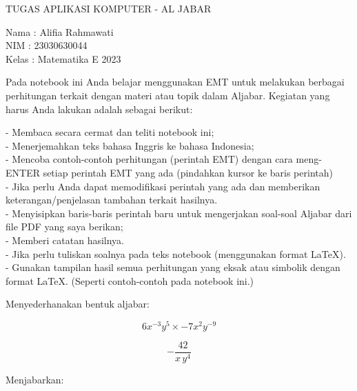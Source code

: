 \documentclass[a4paper,10pt]{article}
\begin{document}
\begin{eulernotebook}
\eulersubheading{}
\begin{eulercomment}
TUGAS APLIKASI KOMPUTER - AL JABAR

Nama  : Alifia Rahmawati\\
NIM   : 23030630044\\
Kelas : Matematika E 2023

\begin{eulercomment}
\begin{eulercomment}
Pada notebook ini Anda belajar menggunakan EMT untuk melakukan
berbagai perhitungan terkait dengan materi atau topik dalam Aljabar.
Kegiatan yang harus Anda lakukan adalah sebagai berikut:

- Membaca secara cermat dan teliti notebook ini;\\
- Menerjemahkan teks bahasa Inggris ke bahasa Indonesia;\\
- Mencoba contoh-contoh perhitungan (perintah EMT) dengan cara
meng-ENTER setiap perintah EMT yang ada (pindahkan kursor ke baris
perintah)\\
- Jika perlu Anda dapat memodifikasi perintah yang ada dan memberikan
keterangan/penjelasan tambahan terkait hasilnya.\\
- Menyisipkan baris-baris perintah baru untuk mengerjakan soal-soal
Aljabar dari file PDF yang saya berikan;\\
- Memberi catatan hasilnya.\\
- Jika perlu tuliskan soalnya pada teks notebook (menggunakan format
LaTeX).\\
- Gunakan tampilan hasil semua perhitungan yang eksak atau simbolik
dengan format LaTeX. (Seperti contoh-contoh pada notebook ini.)

\end{eulercomment}
\begin{eulercomment}
Menyederhanakan bentuk aljabar:

\end{eulercomment}
\begin{eulerformula}
\[
6x^{-3}y^5\times -7x^2y^{-9}
\]
\end{eulerformula}
\begin{eulercomment}
\end{eulercomment}
\begin{eulerformula}
\[
-\frac{42}{x\,y^4}
\]
\end{eulerformula}
\begin{eulercomment}
Menjabarkan:


\end{eulercomment}
\end{eulercomment}
\end{eulercomment}
\end{eulernotebook}
\end{document}
